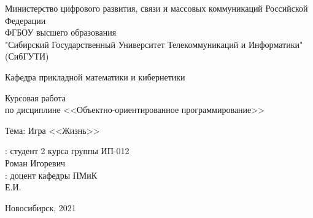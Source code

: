 \documentclass[fleqn]{article}
\begin{document}
\begin{titlepage}
\newpage
\begin{center}
Министерство цифрового развития, связи и массовых коммуникаций Российской Федерации\\
ФГБОУ высшего образования \\
"Сибирский Государственный Университет Телекоммуникаций и Информатики" (СибГУТИ)

Кафедра прикладной математики и кибернетики
\end{center}
\vspace{9em}
\begin{center}
Курсовая работа \\
по дисциплине <<Объектно-ориентированное программирование>>
\end{center}

\begin{center}
Тема: Игра <<Жизнь>>
\end{center}

\vspace{15em}

\begin{center}
: студент 2 курса группы ИП-012 \\
 Роман Игоревич \\
: доцент кафедры ПМиК \\ 
 Е.И.
\end{center}

\vspace{3em}

\vfill

\begin{center}
Новосибирск, 2021
\end{center}
\end{titlepage}


\end{document}
